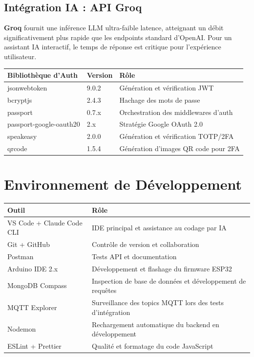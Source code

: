 \subsection{Intégration IA : API Groq}

\textbf{Groq} fournit une inférence LLM ultra-faible latence, atteignant un débit
significativement plus rapide que les endpoints standard d'OpenAI. Pour un assistant IA
interactif, le temps de réponse est critique pour l'expérience utilisateur.

\begin{center}
\begin{tabular}{lll}
\toprule
\textbf{Bibliothèque d'Auth} & \textbf{Version} & \textbf{Rôle} \\
\midrule
jsonwebtoken            & 9.0.2  & Génération et vérification JWT \\
bcryptjs                & 2.4.3  & Hachage des mots de passe \\
passport                & 0.7.x  & Orchestration des middlewares d'auth \\
passport-google-oauth20 & 2.x    & Stratégie Google OAuth 2.0 \\
speakeasy               & 2.0.0  & Génération et vérification TOTP/2FA \\
qrcode                  & 1.5.4  & Génération d'images QR code pour 2FA \\
\bottomrule
\end{tabular}
\end{center}

\section{Environnement de Développement}

\begin{center}
\begin{tabular}{ll}
\toprule
\textbf{Outil} & \textbf{Rôle} \\
\midrule
VS Code + Claude Code CLI & IDE principal et assistance au codage par IA \\
Git + GitHub              & Contrôle de version et collaboration \\
Postman                   & Tests API et documentation \\
Arduino IDE 2.x           & Développement et flashage du firmware ESP32 \\
MongoDB Compass           & Inspection de base de données et développement de requêtes \\
MQTT Explorer             & Surveillance des topics MQTT lors des tests d'intégration \\
Nodemon                   & Rechargement automatique du backend en développement \\
ESLint + Prettier         & Qualité et formatage du code JavaScript \\
\bottomrule
\end{tabular}
\end{center}

